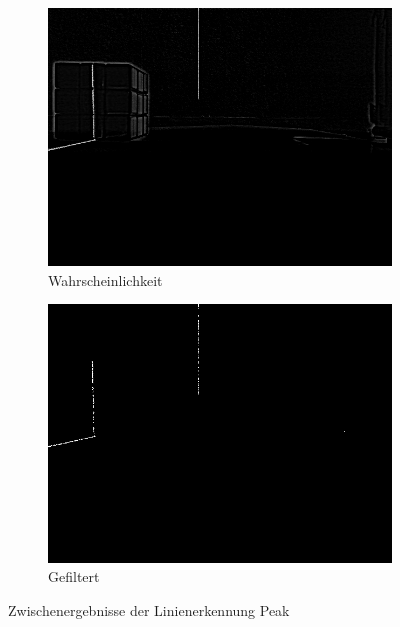 \documentclass[ngerman,a4paper,parskip=half]{scrartcl}
\begin{document}
\begin{figure}[H]
	\begin{subfigure}{0.45\textwidth}
		\includegraphics[width=\textwidth]{includes/line_peak_eval.png}
		\caption{Wahrscheinlichkeit}
	\end{subfigure}
	\hfill
	\begin{subfigure}{0.45\textwidth}
		\includegraphics[width=\textwidth]{includes/line_peak_filtered.png}
		\caption{Gefiltert}
	\end{subfigure}

	\caption{Zwischenergebnisse der Linienerkennung Peak}
	\label{fig:peak}
\end{figure}
\end{document}
